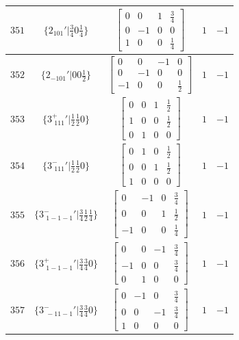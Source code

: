 \documentclass[fleqn,8pt]{jsarticle}
\begin{document}
\begin{longtable}{ccccc}
$ 351 $ & $ \{2{}_{101}{}'|\frac{3}{4} 0 \frac{1}{4}\} $ & $ \begin{bmatrix} 0 & 0 & 1 & \frac{3}{4} \\ 0 & -1 & 0 & 0 \\ 1 & 0 & 0 & \frac{1}{4} \end{bmatrix} $ & $ 1 $ & $ -1 $ \\ \hline
$ 352 $ & $ \{2{}_{-101}{}'|0 0 \frac{1}{2}\} $ & $ \begin{bmatrix} 0 & 0 & -1 & 0 \\ 0 & -1 & 0 & 0 \\ -1 & 0 & 0 & \frac{1}{2} \end{bmatrix} $ & $ 1 $ & $ -1 $ \\ \hline
$ 353 $ & $ \{3^{+}_{\,\,111}{}'|\frac{1}{2} \frac{1}{2} 0\} $ & $ \begin{bmatrix} 0 & 0 & 1 & \frac{1}{2} \\ 1 & 0 & 0 & \frac{1}{2} \\ 0 & 1 & 0 & 0 \end{bmatrix} $ & $ 1 $ & $ -1 $ \\ \hline
$ 354 $ & $ \{3^{-}_{\,\,111}{}'|\frac{1}{2} \frac{1}{2} 0\} $ & $ \begin{bmatrix} 0 & 1 & 0 & \frac{1}{2} \\ 0 & 0 & 1 & \frac{1}{2} \\ 1 & 0 & 0 & 0 \end{bmatrix} $ & $ 1 $ & $ -1 $ \\ \hline
$ 355 $ & $ \{3^{-}_{\,\,1-1-1}{}'|\frac{3}{4} \frac{1}{2} \frac{1}{4}\} $ & $ \begin{bmatrix} 0 & -1 & 0 & \frac{3}{4} \\ 0 & 0 & 1 & \frac{1}{2} \\ -1 & 0 & 0 & \frac{1}{4} \end{bmatrix} $ & $ 1 $ & $ -1 $ \\ \hline
$ 356 $ & $ \{3^{+}_{\,\,1-1-1}{}'|\frac{3}{4} \frac{3}{4} 0\} $ & $ \begin{bmatrix} 0 & 0 & -1 & \frac{3}{4} \\ -1 & 0 & 0 & \frac{3}{4} \\ 0 & 1 & 0 & 0 \end{bmatrix} $ & $ 1 $ & $ -1 $ \\ \hline
$ 357 $ & $ \{3^{-}_{\,\,-11-1}{}'|\frac{3}{4} \frac{3}{4} 0\} $ & $ \begin{bmatrix} 0 & -1 & 0 & \frac{3}{4} \\ 0 & 0 & -1 & \frac{3}{4} \\ 1 & 0 & 0 & 0 \end{bmatrix} $ & $ 1 $ & $ -1 $ \\ \hline

\end{longtable}
\end{document}
